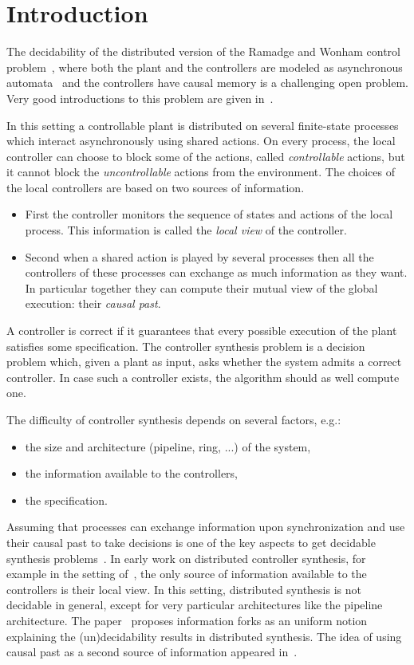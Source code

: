 \documentclass[a4paper,UKenglish]{lipics-v2016}
\begin{document}
\section{Introduction}

The decidability of the distributed version of the Ramadge and Wonham control problem~\cite{ramadge1989control},
where both the plant and the controllers are modeled as asynchronous automata~\cite{zautomata,thebook}
and the controllers have causal memory
is a challenging open problem.
Very good introductions to this problem are given in~\cite{alook,mumu}.

In this setting a controllable plant is distributed on several finite-state processes
which interact asynchronously using shared actions.
On every process, the local controller can choose to block some of the actions,
called \emph{controllable} actions, but it cannot block the \emph{uncontrollable} actions from the environment.
The choices of the local controllers are based on two sources of information.
\begin{itemize}
\item
First the controller monitors the sequence of states and actions of the local process.
This information is called the \emph{local view} of the controller.
\item
Second when a shared action is played by several processes
then all the controllers of these processes can exchange as much information as they want.
In particular together they can compute their mutual view of the global execution:
their \emph{causal past}.
\end{itemize}

A  controller is correct if it guarantees that every
possible execution of the plant
satisfies some specification. The controller synthesis problem is a decision problem which, given a plant as input,
asks whether the system admits a correct controller.
In case such a controller exists, the algorithm should as well compute one.


The difficulty of controller synthesis depends on several factors, e.g.:
\begin{itemize}
\item the size and architecture (pipeline, ring, ...) of the system,
\item the information available to the controllers,
\item the specification.
\end{itemize}
Assuming that processes can exchange information upon synchronization and use their causal past to take decisions is one of the key aspects to get decidable synthesis problems~\cite{gastin}.
In early work on distributed controller synthesis,
for example in the setting of~\cite{pneuli1990distributed}, the only source of information available to the controllers is their local view.
In this setting, distributed synthesis is not decidable in general, except for very particular architectures like the pipeline architecture. The paper~\cite{finkbeiner2005uniform} proposes information forks as an uniform notion explaining the (un)decidability results in distributed synthesis. The idea of using causal past as a second source of information appeared in~\cite{gastin}.
\end{document}

